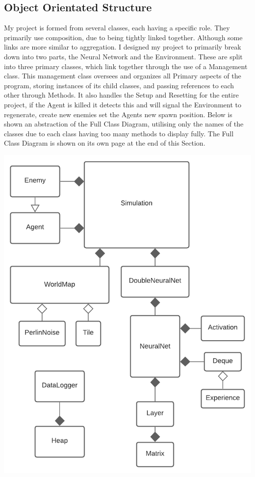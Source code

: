 \begin{flushleft}
        \subsection{Object Orientated Structure}
            \large
            My project is formed from several classes, each having a specific role. They primarily use composition, due to being tightly linked
            together. Although some links are more similar to aggregation. I designed my project to primarily break down into two parts, the
            Neural Network and the Environment. These are split into three primary classes, which link together through the use of a Management
            class. This management class oversees and organizes all Primary aspects of the program, storing instances of its child classes, and
            passing references to each other through Methods. It also handles the Setup and Resetting for the entire project, if the Agent is killed
            it detects this and will signal the Environment to regenerate, create new enemies set the Agents new spawn position. Below is shown an 
            abstraction of the Full Class Diagram, utilising only the names of the classes due to each class having too many methods to display fully.
            The Full Class Diagram is shown on its own page at the end of this Section.

            \vspace{0.5cm}
            \centerline{\includegraphics[width=.65\textwidth]{Images/Design/SimplifiedClassDiagram.png}}
            \vspace{0.5cm}


\end{flushleft}
